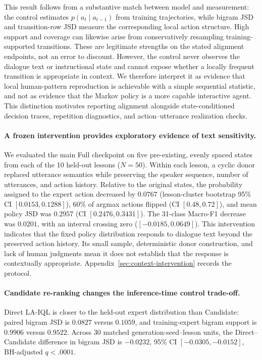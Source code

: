 \documentclass[manuscript,review,anonymous]{acmart}
\begin{document}
This result follows from a substantive match between model and measurement:
the control estimates $p(a_t\mid a_{t-1})$ from training trajectories, while
bigram JSD and transition-row JSD measure the corresponding local action
structure. High support and coverage can likewise arise from conservatively
resampling training-supported transitions. These are legitimate strengths on
the stated alignment endpoints, not an error to discount. However, the control never
observes the dialogue text or instructional state and cannot expose whether a
locally frequent transition is appropriate in context. We therefore interpret
it as evidence that local human-pattern reproduction is achievable with a
simple sequential statistic, and not as evidence that the Markov policy is a
more capable interactive agent. This distinction motivates reporting alignment
alongside state-conditioned decision traces, repetition diagnostics, and
action--utterance realization checks.

\paragraph{A frozen intervention provides exploratory evidence of text sensitivity.}
We evaluated the main Full checkpoint on five pre-existing, evenly spaced
states from each of the 10 held-out lessons ($N=50$). Within each lesson, a
cyclic donor replaced utterance semantics while preserving the speaker
sequence, number of utterances, and action history. Relative to the original
states, the probability assigned to the expert action decreased by $0.0767$
(lesson-cluster bootstrap 95\% CI $[0.0153,0.1288]$), 60\% of argmax actions
flipped (CI $[0.48,0.72]$), and mean policy JSD was $0.2957$ (CI
$[0.2476,0.3431]$). The 31-class Macro-F1 decrease was $0.0201$, with an
interval crossing zero ($[-0.0185,0.0649]$). This intervention indicates that
the fixed policy distribution responds to dialogue text beyond the preserved
action history. Its small sample, deterministic donor construction, and lack of
human judgments mean it does not establish that the response is contextually
appropriate. Appendix~\ref{sec:context-intervention} records the protocol.

\paragraph{Candidate re-ranking changes the inference-time control trade-off.}
Direct LA-IQL is closer to the held-out expert
distribution than Candidate: paired bigram JSD is $0.0827$ versus $0.1059$,
and training-expert bigram support is $0.9906$ versus $0.9522$. Across 30
matched generation-seed--lesson units, the Direct--Candidate difference in bigram JSD is
$-0.0232$, 95\% CI $[-0.0305,-0.0152]$, BH-adjusted $q<.0001$.
\end{document}
